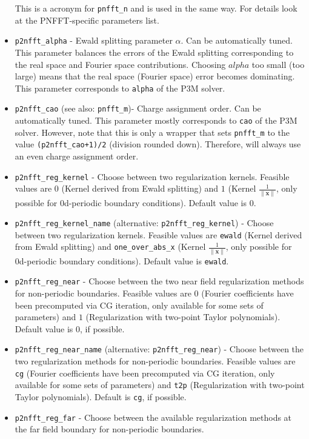 \begin{itemize}
    This is a acronym for \verb!pnfft_n! and is used in the same way. For details look at the PNFFT-specific parameters list.
  \item \verb!p2nfft_alpha! -
    Ewald splitting parameter $\alpha$. Can be automatically tuned. This parameter balances the errors of the Ewald splitting corresponding to
    the real space and Fourier space contributions. Choosing $alpha$ too small (too large) means that the real space (Fourier space) error becomes dominating.
    This parameter corresponds to \verb!alpha! of the P3M solver.
  \item \verb!p2nfft_cao! (see also: \verb!pnfft_m!)-
    Charge assignment order. Can be automatically tuned. This parameter mostly corresponds to \verb!cao! of the P3M solver.
    However, note that this is only a wrapper that sets \verb!pnfft_m! to the value \verb!(p2nfft_cao+1)/2! (division rounded down).
    Therefore, \ptwonfft will always use an even charge assignment order.
  \item \verb!p2nfft_reg_kernel! -
    Choose between two regularization kernels. Feasible values are $0$ (Kernel derived from Ewald splitting)
    and $1$ (Kernel $\frac{1}{\|\mathbf x\|}$, only possible for 0d-periodic boundary conditions). Default value is $0$.
  \item \verb!p2nfft_reg_kernel_name! (alternative: \verb!p2nfft_reg_kernel!) -
    Choose between two regularization kernels. Feasible values are \verb!ewald! (Kernel derived from Ewald splitting)
    and \verb!one_over_abs_x! (Kernel $\frac{1}{\|\mathbf x\|}$, only possible for 0d-periodic boundary conditions). Default value is \verb!ewald!.
  \item \verb!p2nfft_reg_near! -
    Choose between the two near field regularization methods for non-periodic boundaries. Feasible values are $0$ (Fourier coefficients have been precomputed via CG iteration, only available for some sets of parameters)
    and $1$ (Regularization with two-point Taylor polynomials). Default value is $0$, if possible.
  \item \verb!p2nfft_reg_near_name! (alternative: \verb!p2nfft_reg_near!) -
    Choose between the two regularization methods for non-periodic boundaries. Feasible values are \verb!cg! (Fourier coefficients have been precomputed via CG iteration, only available for some sets of parameters)
    and \verb!t2p! (Regularization with two-point Taylor polynomials). Default is \verb!cg!, if possible.
  \item \verb!p2nfft_reg_far! -
    Choose between the available regularization methods at the far field boundary for non-periodic boundaries.

\end{itemize}
